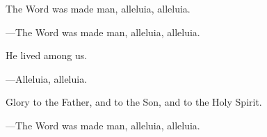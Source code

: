 \responsory

\begin{hangpar}
The Word was made man, alleluia, alleluia.

{\color{red}---\thinspace }The Word was made man, alleluia, alleluia.

\medskip He lived among us.

{\color{red}---\thinspace }Alleluia, alleluia.

\medskip Glory to the Father, and to the Son, and to the Holy Spirit.

{\color{red}---\thinspace }The Word was made man, alleluia, alleluia.
\end{hangpar}